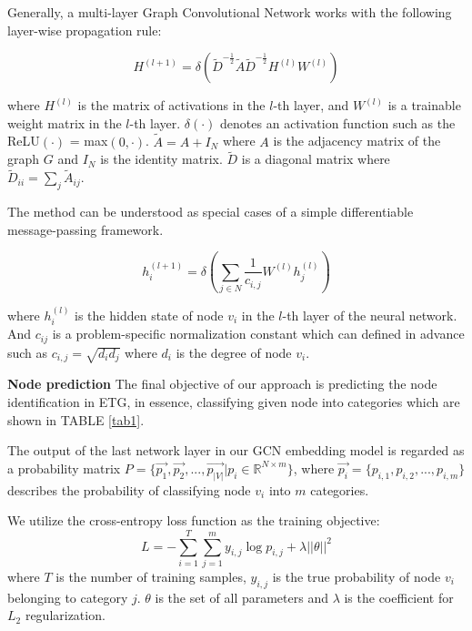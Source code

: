  Generally, a multi-layer Graph Convolutional Network works with the following layer-wise propagation rule:

\begin{equation}
H^{(l+1)}=\delta(\tilde{D}^{-\frac{1}{2}}\tilde{A}\tilde{D}^{-\frac{1}{2}}H^{(l)}W^{(l)})
\label{eq1}
\end{equation}

where $H^{(l)}$ is the matrix of activations in the $l$-th layer, and $W^{(l)}$ is a trainable weight matrix in the $l$-th layer. $\delta(\cdot)$ denotes an activation function such as the ReLU$(\cdot)$ = max$(0,\cdot)$. $\tilde{A}=A+I_N$ where $A$ is the adjacency matrix of the graph $G$ and $I_N$ is the identity matrix. $\tilde{D}$ is a diagonal matrix where $\tilde{D}_{ii}=\sum_{j}\tilde{A}_{ij}$.

The method can be understood as special cases of a simple differentiable message-passing framework.

\begin{equation}
h_i^{(l+1)}=\delta(\sum_{j \in N} \frac{1}{c_{i,j}}W^{(l)}h_j^{(l)})
\label{eq:gcn}
\end{equation}

where $h_i^{(l)}$ is the hidden state of node $v_i$ in the $l$-th layer of the neural network. And $c_{ij}$ is a problem-specific normalization constant which can defined in advance such as $c_{i,j}=\sqrt{d_i d_j}$ where $d_i$ is the degree of node $v_i$.

\textbf{Node prediction}
The final objective of our approach is predicting the node identification in ETG, in essence, classifying given node into categories which are shown in TABLE \ref{tab1}.

The output of the last network layer in our GCN embedding model is regarded as a probability matrix $P=\{\vec{p_1},\vec{p_2},...,\vec{p_{|V|}}|p_i\in \mathbb{R}^{N \times m}\}$, where $\vec{p_i}=\{p_{i,1},p_{i,2},...,p_{i,m}\}$ describes the probability of classifying node $v_i$ into $m$ categories. 

We utilize the cross-entropy loss function as the training objective:
\begin{equation}
L=-\sum_{i=1}^T\sum_{j=1}^m y_{i,j}\log p_{i,j}+\lambda ||\theta||^2
\end{equation}
where $T$ is the number of training samples, $y_{i,j}$ is the true probability of node $v_i$ belonging to category $j$. $\theta$ is the set of all parameters and $\lambda$ is the coefficient for $L_2$  regularization.

